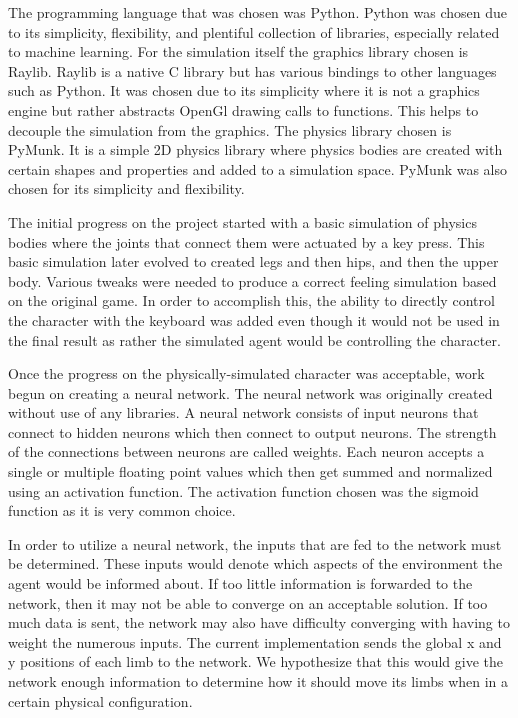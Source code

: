 \documentclass[letterpaper]{article} %
\begin{document}
\par The programming language that was chosen was Python. Python was chosen due to its simplicity, flexibility, and plentiful collection of libraries, especially related to machine learning. For the simulation itself the graphics library chosen is Raylib. Raylib is a native C library but has various bindings to other languages such as Python. It was chosen due to its simplicity where it is not a graphics engine but rather abstracts OpenGl drawing calls to functions. This helps to decouple the simulation from the graphics. The physics library chosen is PyMunk. It is a simple 2D physics library where physics bodies are created with certain shapes and properties and added to a simulation space. PyMunk was also chosen for its simplicity and flexibility.

\par The initial progress on the project started with a basic simulation of physics bodies where the joints that connect them were actuated by a key press. This basic simulation later evolved to created legs and then hips, and then the upper body. Various tweaks were needed to produce a correct feeling simulation based on the original game. In order to accomplish this, the ability to directly control the character with the keyboard was added even though it would not be used in the final result as rather the simulated agent would be controlling the character. 

\par Once the progress on the physically-simulated character was acceptable, work begun on creating a neural network. The neural network was originally created without use of any libraries. A neural network consists of input neurons that connect to hidden neurons which then connect to output neurons. The strength of the connections between neurons are called weights. Each neuron accepts a single or multiple floating point values which then get summed and normalized using an activation function. The activation function chosen was the sigmoid function as it is very common choice. 

\par In order to utilize a neural network, the inputs that are fed to the network must be determined. These inputs would denote which aspects of the environment the agent would be informed about. If too little information is forwarded to the network, then it may not be able to converge on an acceptable solution. If too much data is sent, the network may also have difficulty converging with having to weight the numerous inputs. The current implementation sends the global x and y positions of each limb to the network. We hypothesize that this would give the network enough information to determine how it should move its limbs when in a certain physical configuration.
\end{document}
